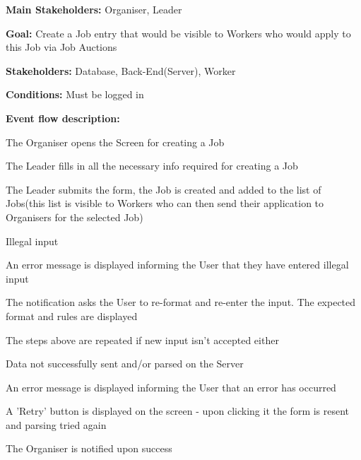 				\noindent {}
				\begin{packed_item}
					\item \textbf{Main Stakeholders:} Organiser, Leader
					\item \textbf{Goal:} Create a Job entry that would be visible to Workers who would apply to this Job via Job Auctions
					\item \textbf{Stakeholders: } Database, Back-End(Server), Worker
					\item \textbf{Conditions: } Must be logged in
					\item \textbf{Event flow description: }
					\begin{packed_enum}
						\item The Organiser opens the Screen for creating a Job
						\item The Leader fills in all the necessary info required for creating a Job
						\item The Leader submits the form, the Job is created and added to the list of Jobs(this list is visible to Workers who can then send their application to Organisers for the selected Job)
					\end{packed_enum}
					
					\begin{packed_item}
						\item[2.a] Illegal input
						\item[] \begin{packed_enum}
							\item An error message is displayed informing the User that they have entered illegal input
							\item The notification asks the User to re-format and re-enter the input. The expected format and rules are displayed
							\item The steps above are repeated if new input isn't accepted either
						\end{packed_enum}
						
						\item[3.a] Data not successfully sent and/or parsed on the Server
						\item[] \begin{packed_enum}
							\item An error message is displayed informing the User that an error has occurred
							\item A 'Retry' button is displayed on the screen - upon clicking it the form is resent and parsing tried again
							\item The Organiser is notified upon success
						\end{packed_enum}
						
					\end{packed_item}
				\end{packed_item}
			
